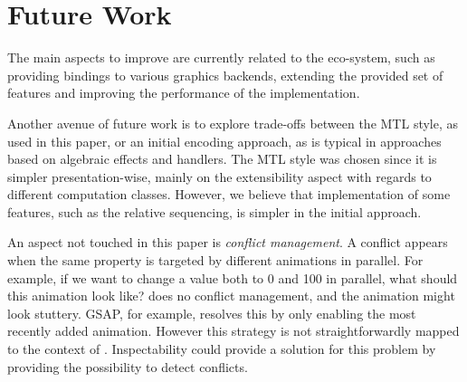 \section{Future Work}
\label{sec:future}

The main aspects to improve are currently related to the \dsl{} eco-system, such as providing bindings to various graphics backends, extending the provided set of features and improving the performance of the implementation.

Another avenue of future work is to explore trade-offs between the MTL style, as used in this paper, or an initial encoding approach, as is typical in approaches based on algebraic effects and handlers. The MTL style was chosen since it is simpler presentation-wise, mainly on the extensibility aspect with regards to different computation classes. However, we believe that implementation of some features, such as the relative sequencing, is simpler in the initial approach.

An aspect not touched in this paper is \emph{conflict management}. A conflict appears when the same property is targeted by different animations in parallel. For example, if we want to change a value both to 0 and 100 in parallel, what should this animation look like? \dsl{} does no conflict management, and the animation might look stuttery. GSAP, for example, resolves this by only enabling the most recently added animation. However this strategy is not straightforwardly mapped to the context of \dsl{}. Inspectability could provide a solution for this problem by providing the possibility to detect conflicts.
